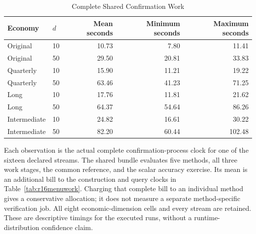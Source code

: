 \begin{table}[!htbp]
\centering\small
\caption{Complete Shared Confirmation Work}
\label{tab:r16menusharedwork}
\begin{tabular}{llrrr}
\toprule
Economy & $d$ & Mean seconds & Minimum seconds & Maximum seconds\\
\midrule
Original & 10 & 10.73 & 7.80 & 11.41\\
Original & 50 & 29.50 & 20.81 & 33.83\\
Quarterly & 10 & 15.90 & 11.21 & 19.22\\
Quarterly & 50 & 63.46 & 41.23 & 71.25\\
Long & 10 & 17.76 & 11.81 & 21.62\\
Long & 50 & 64.37 & 54.64 & 86.26\\
Intermediate & 10 & 24.82 & 16.61 & 30.22\\
Intermediate & 50 & 82.20 & 60.44 & 102.48\\
\bottomrule
\end{tabular}
\par\medskip\noindent\footnotesize\raggedright Each observation is the actual
complete confirmation-process clock for one of the sixteen declared streams.
The shared bundle evaluates five methods, all three work stages, the common
reference, and the scalar accuracy exercise. Its mean is an additional bill
to the construction and query clocks in Table~\ref{tab:r16menuwork}. Charging
that complete bill to an individual method gives a conservative allocation;
it does not measure a separate method-specific verification job. All eight
economic-dimension cells and every stream are retained. These are descriptive
timings for the executed runs, without a runtime-distribution confidence claim.
\end{table}
